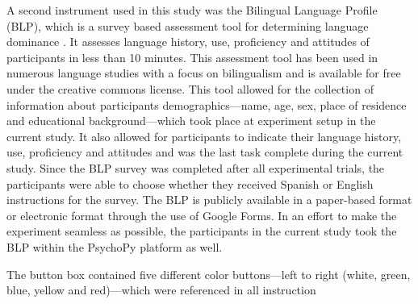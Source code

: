 A second instrument used in this study was the Bilingual Language Profile (BLP), which is a survey based assessment tool for determining language dominance \citep{Birdsong2012-wd}. It assesses language history, use, proficiency and attitudes of participants in less than 10 minutes. This assessment tool has been used in numerous language studies with a focus on bilingualism and is available for free under the creative commons license. This tool allowed for the collection of information about participants demographics---name, age, sex, place of residence and educational background---which took place at experiment setup in the current study. It also allowed for participants to indicate their language history, use, proficiency and attitudes and was the last task complete during the current study. Since the BLP survey was completed after all experimental trials, the participants were able to choose whether they received Spanish or English instructions for the survey. The BLP is publicly available in a paper-based format or electronic format through the use of Google Forms. In an effort to make the experiment seamless as possible, the participants in the current study took the BLP within the PsychoPy platform as well. 

The button box contained five different color buttons---left to right (white, green, blue, yellow and red)---which were referenced in all instruction 





